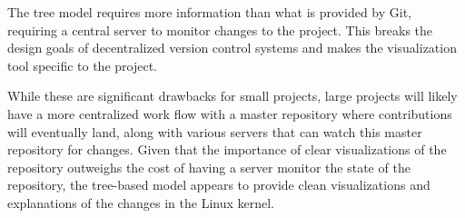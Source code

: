 \documentclass[conference, draftclsnofoot, draft]{IEEEtran}
\begin{document}
The tree model requires more information than what is provided by Git, requiring a
central server to monitor changes to the project. This breaks the design goals of
decentralized version control systems and makes the visualization tool specific to
the project.

While these are significant drawbacks for small projects, large projects will likely
have a more centralized work flow with a master repository where contributions will
eventually land, along with various servers that can watch this master repository
for changes. Given that the importance of clear visualizations of the repository
outweighs the cost of having a server monitor the state of the repository, the
tree-based model appears to provide clean visualizations and explanations of the
changes in the Linux kernel.




\end{document}
